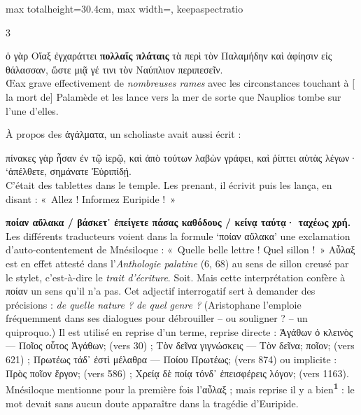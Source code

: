 \documentclass[11pt,twoside]{book}
\newcommand{\italique}[1]{\textit{#1}}
\newcommand{\citComm}[1]{\begin{quoting}[vskip=0.4pt,leftmargin=0.7em,rightmargin=0.2em]#1\end{quoting}}
\newcommand{\marqueur}[1]{\textsuperscript{\color{rubricRed}\textbf{#1}}}
\begin{document}
\begin{adjustbox}{max totalheight=30.4cm, max width=\textwidth, keepaspectratio}
\begin{minipage}{\textwidth}
{\begin{multicols}{3}
\citComm{ὁ γὰρ Οἴαξ ἐγχαράττει \textbf{πολλαῖς πλάταις} τὰ περὶ τὸν Παλαμήδην καὶ ἀφίησιν εἰς θάλασσαν, ὥστε μιᾷ γέ τινι τὸν Ναύπλιον περιπεσεῖν.\\
Œax grave effectivement de \italique{nombreuses rames} avec les circonstances touchant à $[$la mort de$]$ Palamède et les lance vers la mer de sorte que Nauplios tombe sur l'une d'elles.}
\par\vspace{1.5pt}
\noindent À propos des ἀγάλματα, un scholiaste avait aussi écrit :
\citComm{πίνακες γὰρ ἦσαν ἐν τῷ ἱερῷ, καὶ ἀπὸ τούτων λαβὼν γράφει, καὶ ῥίπτει αὐτὰς λέγων· `ἀπέλθετε, σημάνατε Ἐὐριπίδῄ.\\
C'était des tablettes dans le temple. Les prenant, il écrivit puis les lança, en disant : «~Allez ! Informez Euripide !~»}
\par\vspace{1.5pt}
 \textbf{ποίαν αὔλακα / βάσκετ᾽ ἐπείγετε πάσας καθόδους / κείνᾳ ταύτᾳ· ταχέως χρή.} Les différents traducteurs voient dans la formule `ποίαν αὔλακα' une exclamation d'auto-contentement de Mnésiloque : «~Quelle belle lettre ! Quel sillon !~» Αὖλαξ est en effet attesté dans l'\italique{Anthologie palatine} (6, 68) au sens de sillon creusé par le stylet, c'est-à-dire le \italique{trait d'écriture}. Soit. Mais cette interprétation confère à ποίαν un sens qu'il n'a pas. Cet adjectif interrogatif sert à demander des précisions : \italique{de quelle nature ?} \italique{de quel genre ?} (Aristophane l'emploie fréquemment dans ses dialogues pour débrouiller -- ou souligner ? -- un quiproquo.) Il est utilisé en reprise d'un terme, reprise directe : Ἀγάθων ὁ κλεινὸς --- Ποῖος οὗτος Ἁγάθων; (vers 30) ; Τὸν δεῖνα γιγνώσκεις --- Τὸν δεῖνα; ποῖον; (vers 621) ;  Πρωτέως τάδ᾽ ἐστὶ μέλαθρα --- Ποίου Πρωτέως; (vers 874) ou implicite : Πρὸς ποῖον ἔργον; (vers 586) ; Χρείᾳ δὲ ποίᾳ τόνδ᾽ ἐπεισφέρεις λόγον; (vers 1163). Mnésiloque mentionne pour la première fois l'αὖλαξ ; mais reprise il y a bien\marqueur{1} : le mot devait sans aucun doute apparaître dans la tragédie d'Euripide.
\par\end{multicols}}
\end{minipage}\end{adjustbox}
\newpage
\end{document}
